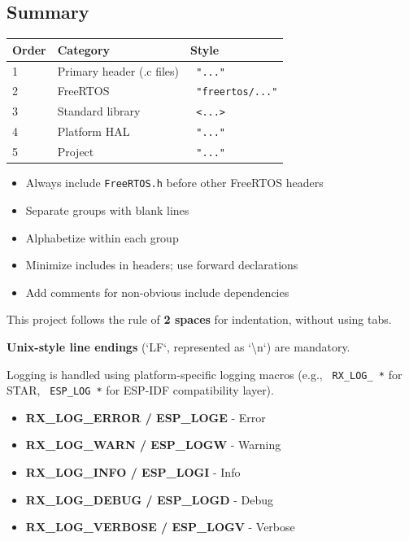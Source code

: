 \subsection{Summary}

\begin{center}
\begin{tabular}{|l|l|l|}
\hline
\textbf{Order} & \textbf{Category} & \textbf{Style} \\
\hline
1 & Primary header (.c files) & \texttt{
      "..."} \\
\hline
2 & FreeRTOS & \texttt{
      "freertos/..."} \\
\hline
3 & Standard library & \texttt{
<...>} \\
\hline
4 & Platform HAL & \texttt{
      "..."} \\
\hline
5 & Project & \texttt{
      "..."} \\
\hline
\end{tabular}
\end{center}

\begin{itemize}
    \item Always include \texttt{FreeRTOS.h} before other FreeRTOS headers
    \item Separate groups with blank lines
    \item Alphabetize within each group
    \item Minimize includes in headers; use forward declarations
    \item Add comments for non-obvious include dependencies
\end{itemize}


This project follows the rule of \textbf{2 spaces} for indentation, without using tabs.


\textbf{Unix-style line endings} (`LF`, represented as `\textbackslash n`) are mandatory.


Logging is handled using platform-specific logging macros (e.g., \texttt{
      RX\_LOG\_ *} for STAR, \texttt{
      ESP\_LOG *} for ESP-IDF compatibility layer).
\begin{itemize}
    \item \textbf{RX\_LOG\_ERROR / ESP\_LOGE} - Error
    \item \textbf{RX\_LOG\_WARN / ESP\_LOGW} - Warning
    \item \textbf{RX\_LOG\_INFO / ESP\_LOGI} - Info
    \item \textbf{RX\_LOG\_DEBUG / ESP\_LOGD} - Debug
    \item \textbf{RX\_LOG\_VERBOSE / ESP\_LOGV} - Verbose
\end{itemize}




